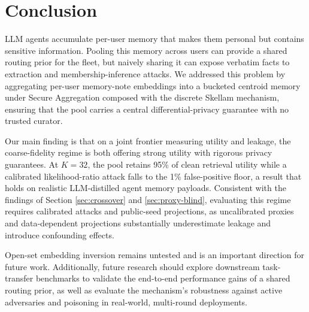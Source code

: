 \documentclass[conference]{IEEEtran}
\theoremstyle{remark}
\begin{document}
\section{Conclusion}\label{sec:conclusion}

LLM agents accumulate per-user memory that makes them personal but contains sensitive information. Pooling this memory across users can provide a shared routing prior for the fleet, but naively sharing it can expose verbatim facts to extraction and membership-inference attacks. We addressed this problem by aggregating per-user memory-note embeddings into a bucketed centroid memory under Secure Aggregation composed with the discrete Skellam mechanism, ensuring that the pool carries a central differential-privacy guarantee with no trusted curator.

Our main finding is that on a joint frontier measuring utility and leakage, the coarse-fidelity regime is both offering strong utility with rigorous privacy guarantees. At $K = 32$, the pool retains 95\% of clean retrieval utility while a calibrated likelihood-ratio attack falls to the 1\% false-positive floor, a result that holds on realistic LLM-distilled agent memory payloads. Consistent with the findings of Section \ref{sec:crossover} and \ref{sec:proxy-blind}, evaluating this regime requires calibrated attacks and public-seed projections, as uncalibrated proxies and data-dependent projections substantially underestimate leakage and introduce confounding effects.

Open-set embedding inversion remains untested and is an important direction for future work. Additionally, future research should explore downstream task-transfer benchmarks to validate the end-to-end performance gains of a shared routing prior, as well as evaluate the mechanism's robustness against active adversaries and poisoning in real-world, multi-round deployments.
\end{document}
